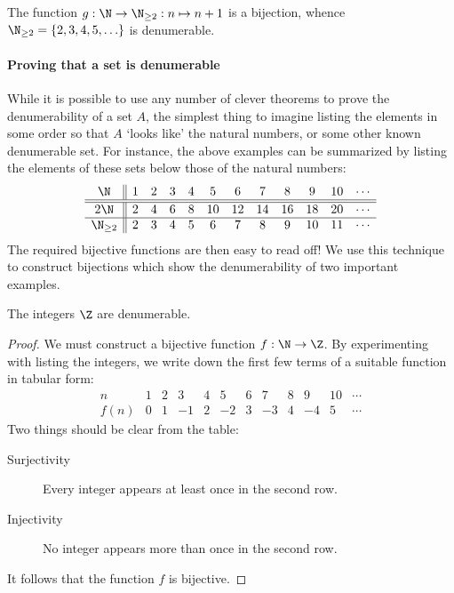 \begin{example}
The function $g:\N\to\N_{\ge 2}:n\mapsto n+1$ is a bijection, whence $\N_{\ge 2}=\{2,3,4,5,\ldots\}$ is denumerable.
\end{example}



\paragraph{Proving that a set is denumerable}

While it is possible to use any number of clever theorems to prove the denumerability of a set $A$, the simplest thing to imagine listing the elements in some order so that $A$ `looks like' the natural numbers, or some other known denumerable set. For instance, the above examples can be summarized by listing the elements of these sets below those of the natural numbers:
\[\begin{array}{c||ccccccccccc}
\N&1&2&3&4&5&6&7&8&9&10&\cdots\\\hline\hline
2\N&2&4&6&8&10&12&14&16&18&20&\cdots\\\hline
\N_{\ge 2}&2&3&4&5&6&7&8&9&10&11&\cdots
\end{array}\]
The required bijective functions are then easy to read off! We use this technique to construct bijections which show the denumerability of two important examples.

\begin{thm}\label{thm:zcount}
The integers $\Z$ are denumerable.
\end{thm}

\begin{proof}
We must construct a bijective function $f:\N\to\Z$. By experimenting with listing the integers, we write down the first few terms of a suitable function in tabular form:
\[\begin{array}{c|ccccccccccc}
n&1&2&3&4&5&6&7&8&9&10&\cdots\\\hline
f(n)&0&1&-1&2&-2&3&-3&4&-4&5&\cdots
\end{array}\]
Two things should be clear from the table:
\begin{description}
\item[Surjectivity]\quad Every integer appears at least once in the second row.
\item[Injectivity]\quad No integer appears more than once in the second row.
\end{description}
It follows that the function $f$ is bijective.
\end{proof}


